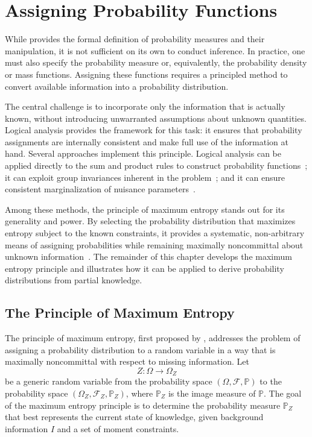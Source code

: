 \chapter{Assigning Probability Functions}
While  provides the formal definition of probability measures and their manipulation, it is not sufficient on its own to conduct inference. In practice, one must also specify the probability measure or, equivalently, the probability density or mass functions. Assigning these functions requires a principled method to convert available information into a probability distribution.

The central challenge is to incorporate only the information that is actually known, without introducing unwarranted assumptions about unknown quantities. Logical analysis provides the framework for this task: it ensures that probability assignments are internally consistent and make full use of the information at hand. Several approaches implement this principle. Logical analysis can be applied directly to the sum and product rules to construct probability functions~\citep{jaynes_11}; it can exploit group invariances inherent in the problem~\citep{jaynes_16}; and it can ensure consistent marginalization of nuisance parameters~\citep{jaynes_21}.

Among these methods, the principle of maximum entropy\citep{Jaynes1957} stands out for its generality and power. By selecting the probability distribution that maximizes entropy subject to the known constraints, it provides a systematic, non-arbitrary means of assigning probabilities while remaining maximally noncommittal about unknown information~\cite{zellner_bayesian_inference, jaynes_16, jaynes_19, shore_17, shore_18}. The remainder of this chapter develops the maximum entropy principle and illustrates how it can be applied to derive probability distributions from partial knowledge.

\section{The Principle of Maximum Entropy}
\label{sec:maxent}
The principle of maximum entropy, first proposed by \citet{Jaynes1957}, addresses the problem of assigning a probability distribution to a random variable in a way that is maximally noncommittal with respect to missing information. Let
\begin{equation}
	Z: \Omega \to \Omega_Z
\end{equation}
be a generic random variable from the probability space $(\Omega, \mathcal{F}, \mathbb{P})$ to the probability space $(\Omega_Z,\mathcal{F}_Z, \mathbb{P}_Z)$, where $\mathbb{P}_Z$ is the image measure of $\mathbb{P}$. The goal of the maximum entropy principle is to determine the probability measure $\mathbb{P}_Z$ that best represents the current state of knowledge, given background information $I$ and a set of moment constraints. 

